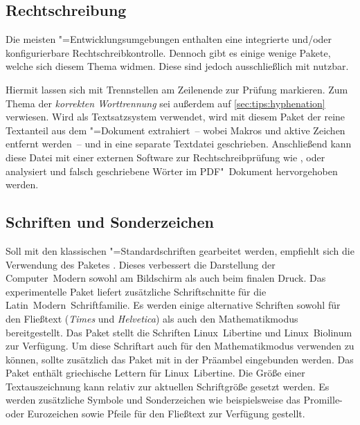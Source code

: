 \subsection{%
  Rechtschreibung%
}
%
Die meisten "=Entwicklungsumgebungen enthalten eine integrierte 
und/oder konfigurierbare Rechtschreibkontrolle. Dennoch gibt es einige wenige 
Pakete, welche sich diesem Thema widmen. Diese sind jedoch ausschließlich 
mit  nutzbar.

\begin{DeclarePackages}
  Hiermit lassen sich mit  Trennstellen am Zeilenende zur 
  Prüfung markieren. Zum Thema der \textit{korrekten Worttrennung} sei außerdem 
  auf \autoref{sec:tips:hyphenation} verwiesen.
  Wird  als Textsatzsystem verwendet, wird mit diesem Paket 
  der reine Textanteil aus dem "=Dokument extrahiert~-- wobei 
  Makros und aktive Zeichen entfernt werden~-- und in eine separate Textdatei 
  geschrieben. Anschließend kann diese Datei mit einer externen Software zur 
  Rechtschreibprüfung wie ,  oder 
   analysiert und falsch geschriebene Wörter im 
  PDF"~Dokument hervorgehoben werden.
\end{DeclarePackages}
%



\subsection{Schriften und Sonderzeichen}
%
\begin{DeclarePackages}
  Soll mit den klassischen "=Standardschriften gearbeitet werden, 
  empfiehlt sich die Verwendung des Paketes . Dieses 
  verbessert die Darstellung der Computer~Modern sowohl am Bildschirm als auch 
  beim finalen Druck. Das experimentelle Paket  liefert 
  zusätzliche Schriftschnitte für die Latin~Modern~Schriftfamilie.
  Es werden einige alternative Schriften sowohl für den Fließtext 
  (\textit{Times} und \textit{Helvetica}) als auch den Mathematikmodus 
  bereitgestellt.
  Das Paket stellt die Schriften Linux~Libertine und Linux~Biolinum zur 
  Verfügung. Um diese Schriftart auch für den Mathematikmodus verwenden zu 
  können, sollte zusätzlich das Paket  mit 
   in der 
  Präambel eingebunden werden. Das Paket  enthält griechische 
  Lettern für Linux~Libertine.
  Die Größe einer Textauszeichnung kann relativ zur aktuellen Schriftgröße 
  gesetzt werden.
  Es werden zusätzliche Symbole und Sonderzeichen wie beispielsweise das 
  Promille- oder Eurozeichen sowie Pfeile für den Fließtext zur Verfügung 
  gestellt.
\end{DeclarePackages}

